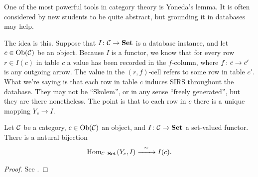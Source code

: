 \documentclass[CT4S-EN-RU]{subfiles}
\begin{document}

\subsubsection{}\label{sec:yoneda}

One of the most powerful tools in category theory is Yoneda's lemma. It is often considered by new students to be quite abstract, but grounding it in databases may help.

The idea is this. Suppose that $I\colon\mathcal{C}\rightarrow{\bf Set}$ is a database instance, and let $c\in\textnormal{Ob}(\mathcal{C})$ be an object. Because $I$ is a functor, we know that for every row $r\in I(c)$ in table $c$ a value has been recorded in the $f$-column, where $f\colon c\rightarrow c'$ is any outgoing arrow. The value in the $(r,f)$-cell refers to some row in table $c'$. What we're saying is that each row in table $c$ induces SIRS throughout the database. They may not be “Skolem”, or in any sense “freely generated”, but they are there nonetheless. The point is that to each row in $c$ there is a unique mapping $Y_c\to I$. 

\begin{lemma}\label{lemma:Yoneda}

Let $\mathcal{C}$ be a category, $c\in\textnormal{Ob}(\mathcal{C})$ an object, and $I\colon\mathcal{C}\rightarrow{\bf Set}$ a set-valued functor. There is a natural bijection $$\textnormal{Hom}_{\mathcal{C}{\text \textendash}{\bf Set}}(Y_c,I)\xrightarrow{\ \ \cong\ \ }I(c).$$

\end{lemma}

\begin{proof}

See \cite{Mac}.

\end{proof}
\end{document}
